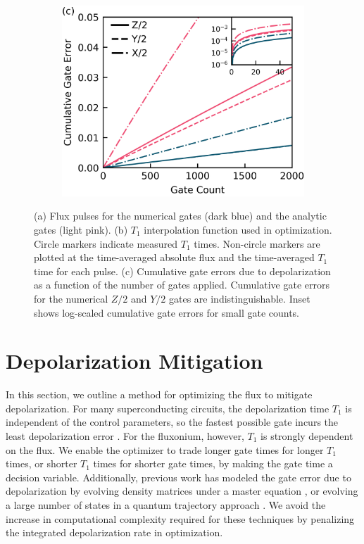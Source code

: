 \begin{figure}[ht]
\begin{subfigure}{.23\textwidth}
    \caption{\label{fig:longitudeb}}
  \end{subfigure}\hfill
  \begin{subfigure}{.4\textwidth}
    \includegraphics[width=\linewidth]{assets/f1c.png}
    \caption{\label{fig:longitudec}}
  \end{subfigure}
  \caption{
    (a) Flux pulses for the numerical gates (dark blue)
    and the analytic gates (light pink).
    (b) $T_{1}$ interpolation function used in optimization. Circle markers
    indicate measured $T_{1}$ times. Non-circle markers
    are plotted at the time-averaged 
    absolute flux and the time-averaged $T_{1}$ time for each pulse.
    (c) Cumulative gate errors due to depolarization as a function of the
    number of gates applied.
    Cumulative gate errors for the numerical $Z/2$ and $Y/2$ gates
    are indistinguishable. Inset shows log-scaled cumulative gate errors
    for small gate counts.
  }
  \label{fig:longitude}
\end{figure}

\section{Depolarization Mitigation\label{sec:longitude}}
In this section, we outline a method
for optimizing the flux to mitigate depolarization.
For many superconducting circuits, the depolarization time
$T_{1}$ is independent of the control parameters,
so the fastest possible gate incurs the least depolarization error
\cite{schulteherbruggen2011optimal}.
For the fluxonium, however, $T_{1}$ is strongly dependent on the flux.
We enable the optimizer to trade longer gate times
for longer $T_{1}$ times, or shorter $T_{1}$ times for shorter gate times,
by making the gate time a decision variable.
Additionally, previous work has modeled the gate error due to depolarization
by evolving density matrices under a master
equation \cite{rembold2020introduction, schulteherbruggen2011optimal},
or evolving a large number of states in a quantum trajectory approach
\cite{abdelhafez2019gradient}.
We avoid the increase in computational complexity required for these
techniques by penalizing the integrated depolarization rate in optimization.


